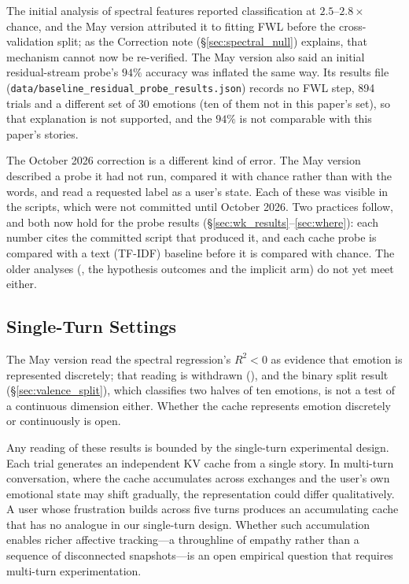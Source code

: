The initial analysis of spectral features reported classification at $2.5$--$2.8\times$ chance, and the May version attributed it to fitting FWL before the cross-validation split; as the Correction note (\S\ref{sec:spectral_null}) explains, that mechanism cannot now be re-verified. The May version also said an initial residual-stream probe's $94\%$ accuracy was inflated the same way. Its results file (\texttt{data/baseline\_residual\_probe\_results.json}) records no FWL step, 894 trials and a different set of 30 emotions (ten of them not in this paper's set), so that explanation is not supported, and the $94\%$ is not comparable with this paper's stories.

The October 2026 correction is a different kind of error. The May version described a probe it had not run, compared it with chance rather than with the words, and read a requested label as a user's state. Each of these was visible in the scripts, which were not committed until October 2026. Two practices follow, and both now hold for the probe results (\S\ref{sec:wk_results}--\ref{sec:where}): each number cites the committed script that produced it, and each cache probe is compared with a text (TF-IDF) baseline before it is compared with chance. The older analyses (, the hypothesis outcomes and the implicit arm) do not yet meet either.

\subsection{Single-Turn Settings}

The May version read the spectral regression's $R^2 < 0$ as evidence that emotion is represented discretely; that reading is withdrawn (), and the binary split result (\S\ref{sec:valence_split}), which classifies two halves of ten emotions, is not a test of a continuous dimension either. Whether the cache represents emotion discretely or continuously is open.

Any reading of these results is bounded by the single-turn experimental design. Each trial generates an independent KV cache from a single story. In multi-turn conversation, where the cache accumulates across exchanges and the user's own emotional state may shift gradually, the representation could differ qualitatively. A user whose frustration builds across five turns produces an accumulating cache that has no analogue in our single-turn design. Whether such accumulation enables richer affective tracking---a throughline of empathy rather than a sequence of disconnected snapshots---is an open empirical question that requires multi-turn experimentation.


